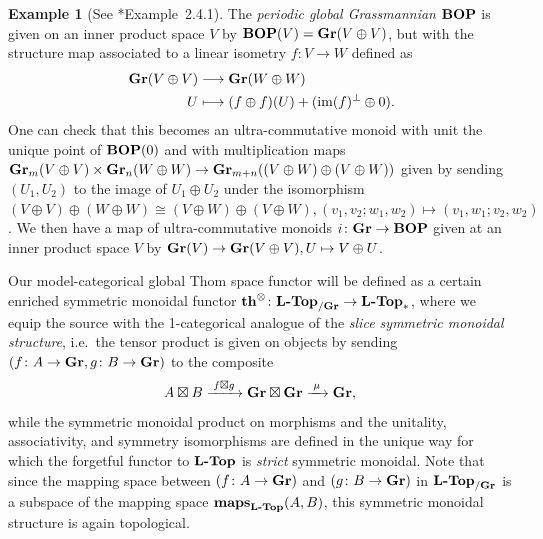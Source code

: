 \documentclass[reqno]{memo-l}
\theoremstyle{mythm}
\theoremstyle{definition}
\newtheorem{ex}[thm]{Example}
\numberwithin{equation}{section}
\newcommand{\cat}[1]{\textbf{\textup{#1}}}
\newcommand{\maps}{\cat{maps}}
\DeclareMathOperator{\im}{im}
\begin{document}
\begin{ex}[See \cite{schwede2018global}*{Example~2.4.1}]\label{ex:BOP}
    The \emph{periodic global Grassmannian} $\cat{BOP}$ is given on an inner product space $V$ by $\cat{BOP}(V)=\cat{Gr}(V\oplus V)$, but with the structure map associated to a linear isometry $f\colon V\to W$ defined as
    \begin{align*}
        \cat{Gr}(V\oplus V)&\longrightarrow\cat{Gr}(W\oplus W)\\
        U&\longmapsto (f\oplus f)(U) + (\im(f)^\perp\oplus 0)\rlap.
    \end{align*}
    One can check that this becomes an ultra-commutative monoid with unit the unique point of $\cat{BOP}(0)$ and with multiplication maps $\cat{Gr}_m(V\oplus V)\times\cat{Gr}_n(W\oplus W)\to\cat{Gr}_{m+n}((V\oplus W)\oplus (V\oplus W))$ given by sending $(U_1,U_2)$ to the image of $U_1\oplus U_2$ under the isomorphism $(V\oplus V)\oplus (W\oplus W)\cong (V\oplus W)\oplus (V\oplus W), (v_1,v_2;w_1,w_2)\mapsto (v_1,w_1;v_2,w_2)$. We then have a map of ultra-commutative monoids $i\colon\cat{Gr}\to\cat{BOP}$ given at an inner product space $V$ by $\cat{Gr}(V)\to\cat{Gr}(V\oplus V),U\mapsto V\oplus U$.
\end{ex}

Our model-categorical global Thom space functor will be defined as a certain enriched symmetric monoidal functor $\cat{th}^\otimes\colon\cat{$\cat{L}$-Top}_{/\cat{Gr}}\to\cat{$\cat{L}$-Top}_*$, where we equip the source with the 1-categorical analogue of the \emph{slice symmetric monoidal structure}, i.e.\ the tensor product is given on objects by sending $(f\colon A\to \cat{Gr}, g\colon B\to \cat{Gr})$ to the composite
\[
    A\boxtimes B\xrightarrow{\;f\boxtimes g\;} \cat{Gr}\boxtimes \cat{Gr}\xrightarrow{\;\mu\;} \cat{Gr},
\]
while the symmetric monoidal product on morphisms and the unitality, associativity, and symmetry isomorphisms are defined in the unique way for which the forgetful functor to $\cat{$\cat{L}$-Top}$ is \emph{strict} symmetric monoidal. Note that since the mapping space between $(f\colon A\to \cat{Gr})$ and $(g\colon B\to \cat{Gr})$ in $\cat{$\cat{L}$-Top}_{/\cat{Gr}}$ is a subspace of the mapping space $\maps_{\cat{$\cat{L}$-Top}}(A,B)$, this symmetric monoidal structure is again topological. 
\end{document}

